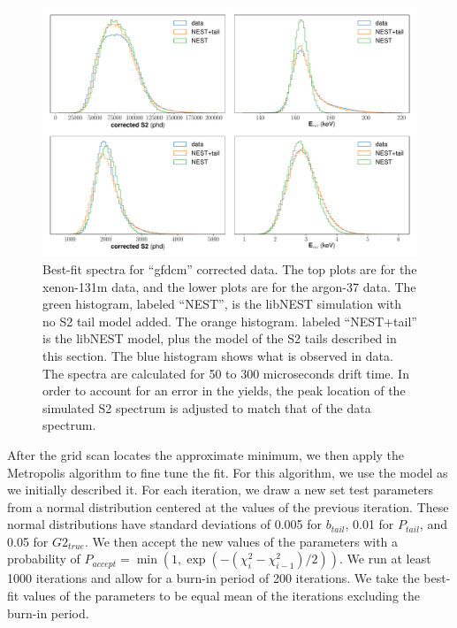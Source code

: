 \begin{figure}[h!]
  \centering
  \includegraphics[width=\textwidth]{Figures/S2tail_hists_gfdcm.pdf}
\caption{Best-fit spectra for ``gfdcm'' corrected data. The top plots are for the xenon-131m data, and the lower plots are for the argon-37 data. The green histogram, labeled ``NEST'', is the libNEST simulation with no S2 tail model added. The orange histogram. labeled ``NEST+tail'' is the libNEST model, plus the model of the S2 tails described in this section. The blue histogram shows what is observed in data. The spectra are calculated for 50 to 300 microseconds drift time. In order to account for an error in the yields, the peak location of the simulated S2 spectrum is adjusted to match that of the data spectrum.}
\label{fig:s2bestfit_spec_gfdcm}
\end{figure}

After the grid scan locates the approximate minimum, we then apply the Metropolis algorithm to fine tune the fit\cite{metropolis_1,metropolis_2}. For this algorithm, we use the model as we initially described it. For each iteration, we draw a new set test parameters from a normal distribution centered at the values of the previous iteration. These normal distributions have standard deviations of  0.005 for $b_{tail}$, 0.01 for $P_{tail}$, and 0.05 for $G2_{true}$. We then accept the new values of the parameters with a probability of $P_{accept}=\min(1,\exp(-(\chi_i^2-\chi_{i-1}^2)/2))$. We run at least 1000 iterations and allow for a burn-in period of 200 iterations. We take the best-fit values of the parameters to be equal mean of the iterations excluding the burn-in period.

